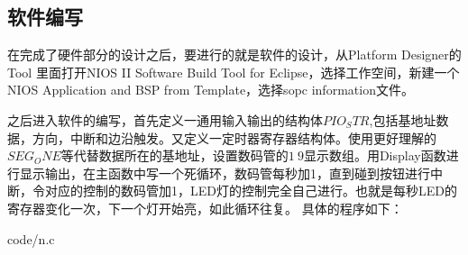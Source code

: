 \documentclass[UTF8]{ctexart}
\begin{document}
\subsection{软件编写}
在完成了硬件部分的设计之后，要进行的就是软件的设计，从Platform Designer的Tool 里面打开NIOS II Software Build Tool for Eclipse，选择工作空间，新建一个NIOS Application and BSP from Template，选择sopc information文件。

之后进入软件的编写，首先定义一通用输入输出的结构体$PIO_STR$,包括基地址数据，方向，中断和边沿触发。又定义一定时器寄存器结构体。使用更好理解的$SEG_ONE$等代替数据所在的基地址，设置数码管的$1~9$显示数组。用Display函数进行显示输出，在主函数中写一个死循环，数码管每秒加1，直到碰到按钮进行中断，令对应的控制的数码管加1，LED灯的控制完全自己进行。也就是每秒LED的寄存器变化一次，下一个灯开始亮，如此循环往复。
具体的程序如下：

{code/n.c}
\end{document}
